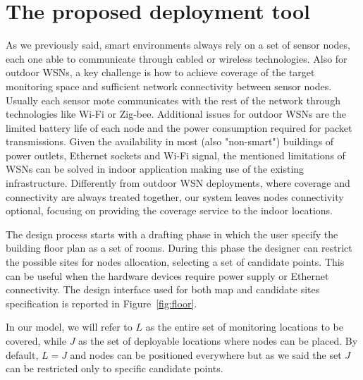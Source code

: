 \section{The proposed deployment tool}\label{sec:plan_tool}
As we previously said, smart environments always rely on a set of sensor nodes, each one able to communicate through cabled or wireless technologies. Also for outdoor WSNs, a key challenge is how to achieve coverage of the target monitoring space and sufficient network connectivity between sensor nodes. Usually each sensor mote communicates with the rest of the network through technologies like Wi-Fi or Zig-bee. Additional issues for outdoor WSNs are the limited battery life of each node and the power consumption required for packet transmissions. Given the availability in most (also "non-smart") buildings of power outlets, Ethernet sockets and Wi-Fi signal, the mentioned limitations of WSNs can be solved in indoor application making use of the existing infrastructure. Differently from outdoor WSN deployments, where coverage and connectivity are always treated together, our system leaves nodes connectivity optional, focusing on providing the coverage service to the indoor locations.

The design process starts with a drafting phase in which the user specify the building floor plan as a set of rooms. During this phase the designer can restrict the possible sites for nodes allocation, selecting a set of candidate points. This can be useful when the hardware devices require power supply or Ethernet connectivity. The design interface used for both map and candidate sites specification is reported in Figure~\ref{fig:floor}.

In our model, we will refer to \(L\) as the entire set of monitoring locations to be covered, while \(J\) as the set of deployable locations where nodes can be placed. By default, \(L = J\) and nodes can be positioned everywhere but as we said the set \(J\) can be restricted only to specific candidate points.

